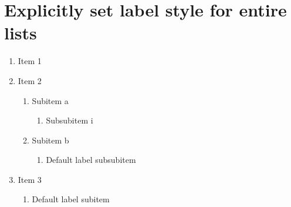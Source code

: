 \documentclass{article}
\begin{document}
\section{Explicitly set label style for entire lists}

\begin{enumerate}[<1>]
    \item Item 1
    \item Item 2
        \begin{enumerate}['I']
            \item Subitem a
                \begin{enumerate}[...a]
                    \item Subsubitem i
                \end{enumerate}
            \item Subitem b
                \begin{enumerate}
                    \item Default label subsubitem
                \end{enumerate}
        \end{enumerate}
    \item Item 3
        \begin{enumerate}
            \item Default label subitem
        \end{enumerate}
\end{enumerate}
\end{document}
